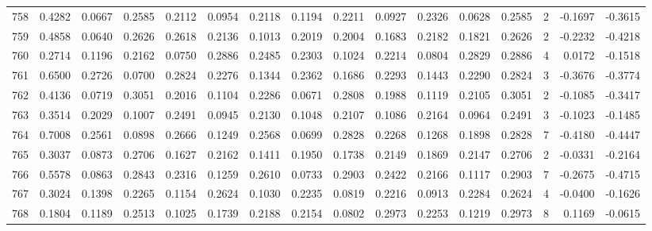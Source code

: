\begin{tabular}{lrrrrrrrrrrrrrrr}
758 &      0.4282 &  0.0667 &  0.2585 &  0.2112 &  0.0954 &  0.2118 &  0.1194 &  0.2211 &  0.0927 &  0.2326 &   0.0628 &     0.2585 &      2 &                   -0.1697 &                    -0.3615 \\
759 &      0.4858 &  0.0640 &  0.2626 &  0.2618 &  0.2136 &  0.1013 &  0.2019 &  0.2004 &  0.1683 &  0.2182 &   0.1821 &     0.2626 &      2 &                   -0.2232 &                    -0.4218 \\
760 &      0.2714 &  0.1196 &  0.2162 &  0.0750 &  0.2886 &  0.2485 &  0.2303 &  0.1024 &  0.2214 &  0.0804 &   0.2829 &     0.2886 &      4 &                    0.0172 &                    -0.1518 \\
761 &      0.6500 &  0.2726 &  0.0700 &  0.2824 &  0.2276 &  0.1344 &  0.2362 &  0.1686 &  0.2293 &  0.1443 &   0.2290 &     0.2824 &      3 &                   -0.3676 &                    -0.3774 \\
762 &      0.4136 &  0.0719 &  0.3051 &  0.2016 &  0.1104 &  0.2286 &  0.0671 &  0.2808 &  0.1988 &  0.1119 &   0.2105 &     0.3051 &      2 &                   -0.1085 &                    -0.3417 \\
763 &      0.3514 &  0.2029 &  0.1007 &  0.2491 &  0.0945 &  0.2130 &  0.1048 &  0.2107 &  0.1086 &  0.2164 &   0.0964 &     0.2491 &      3 &                   -0.1023 &                    -0.1485 \\
764 &      0.7008 &  0.2561 &  0.0898 &  0.2666 &  0.1249 &  0.2568 &  0.0699 &  0.2828 &  0.2268 &  0.1268 &   0.1898 &     0.2828 &      7 &                   -0.4180 &                    -0.4447 \\
765 &      0.3037 &  0.0873 &  0.2706 &  0.1627 &  0.2162 &  0.1411 &  0.1950 &  0.1738 &  0.2149 &  0.1869 &   0.2147 &     0.2706 &      2 &                   -0.0331 &                    -0.2164 \\
766 &      0.5578 &  0.0863 &  0.2843 &  0.2316 &  0.1259 &  0.2610 &  0.0733 &  0.2903 &  0.2422 &  0.2166 &   0.1117 &     0.2903 &      7 &                   -0.2675 &                    -0.4715 \\
767 &      0.3024 &  0.1398 &  0.2265 &  0.1154 &  0.2624 &  0.1030 &  0.2235 &  0.0819 &  0.2216 &  0.0913 &   0.2284 &     0.2624 &      4 &                   -0.0400 &                    -0.1626 \\
768 &      0.1804 &  0.1189 &  0.2513 &  0.1025 &  0.1739 &  0.2188 &  0.2154 &  0.0802 &  0.2973 &  0.2253 &   0.1219 &     0.2973 &      8 &                    0.1169 &                    -0.0615 \\

\end{tabular}
